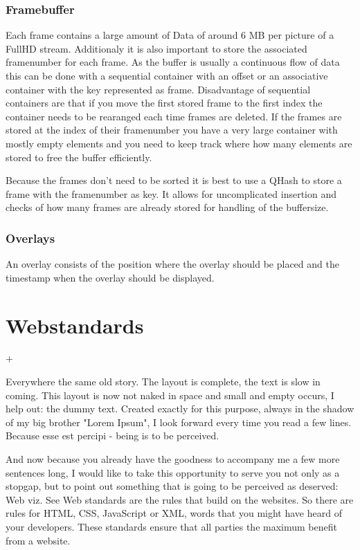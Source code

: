 \subsubsection{Framebuffer}
\label{sec:frameBuffer}
Each frame contains a large amount of Data of around 6 MB per picture of a FullHD stream. Additionaly it is also important to store the associated framenumber for each frame. As the buffer is usually a continuous flow of data this can be done with a sequential container with an offset or an associative container with the key represented as frame. Disadvantage of sequential containers are that if you move the first stored frame to the first index the container needs to be rearanged each time frames are deleted. If the frames are stored at the index of their framenumber you have a very large container with mostly empty elements and you need to keep track where how many elements are stored to free the buffer efficiently.

Because the frames don't need to be sorted it is best to use a QHash to store a frame with the framenumber as key. It allows for uncomplicated insertion and checks of how many frames are already stored for handling of the buffersize.
\subsubsection{Overlays}
\label{sec:overlays}
An overlay consists of the position where the overlay should be placed and the timestamp when the overlay should be displayed. 
\section{Webstandards}+
\label{sec:satzspiegeltest_webstandards}

Everywhere the same old story. The layout is complete, the text is slow in coming. This layout is now not naked in space and small and empty occurs, I help out: the dummy text. Created exactly for this purpose, always in the shadow of my big brother "Lorem Ipsum", I look forward every time you read a few lines. Because esse est percipi - being is to be perceived.

And now because you already have the goodness to accompany me a few more sentences long, I would like to take this opportunity to serve you not only as a stopgap, but to point out something that is going to be perceived as deserved: Web viz. See Web standards are the rules that build on the websites. So there are rules for HTML, CSS, JavaScript or XML, words that you might have heard of your developers. These standards ensure that all parties the maximum benefit from a website.

